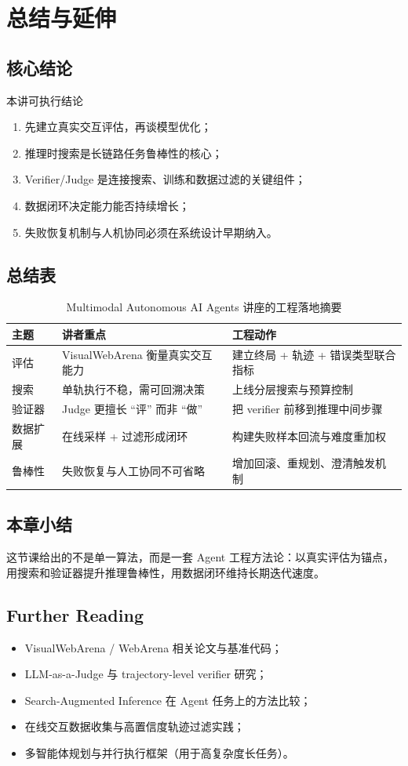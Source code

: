 \section{总结与延伸}

\subsection{核心结论}
\begin{importantbox}{本讲可执行结论}
\begin{enumerate}
    \item 先建立真实交互评估，再谈模型优化；
    \item 推理时搜索是长链路任务鲁棒性的核心；
    \item Verifier/Judge 是连接搜索、训练和数据过滤的关键组件；
    \item 数据闭环决定能力能否持续增长；
    \item 失败恢复机制与人机协同必须在系统设计早期纳入。
\end{enumerate}
\end{importantbox}

\subsection{总结表}
\begin{table}[H]
\centering
\small
\begin{tabular}{p{2.6cm}p{3.9cm}p{4.3cm}}
\toprule
\textbf{主题} & \textbf{讲者重点} & \textbf{工程动作} \\
\midrule
评估 & VisualWebArena 衡量真实交互能力 & 建立终局 + 轨迹 + 错误类型联合指标 \\
搜索 & 单轨执行不稳，需可回溯决策 & 上线分层搜索与预算控制 \\
验证器 & Judge 更擅长 ``评'' 而非 ``做'' & 把 verifier 前移到推理中间步骤 \\
数据扩展 & 在线采样 + 过滤形成闭环 & 构建失败样本回流与难度重加权 \\
鲁棒性 & 失败恢复与人工协同不可省略 & 增加回滚、重规划、澄清触发机制 \\
\bottomrule
\end{tabular}
\caption{Multimodal Autonomous AI Agents 讲座的工程落地摘要}
\end{table}

\subsection{本章小结}
这节课给出的不是单一算法，而是一套 Agent 工程方法论：以真实评估为锚点，用搜索和验证器提升推理鲁棒性，用数据闭环维持长期迭代速度。

\subsection{Further Reading}
\begin{itemize}
    \item VisualWebArena / WebArena 相关论文与基准代码；
    \item LLM-as-a-Judge 与 trajectory-level verifier 研究；
    \item Search-Augmented Inference 在 Agent 任务上的方法比较；
    \item 在线交互数据收集与高置信度轨迹过滤实践；
    \item 多智能体规划与并行执行框架（用于高复杂度长任务）。
\end{itemize}


